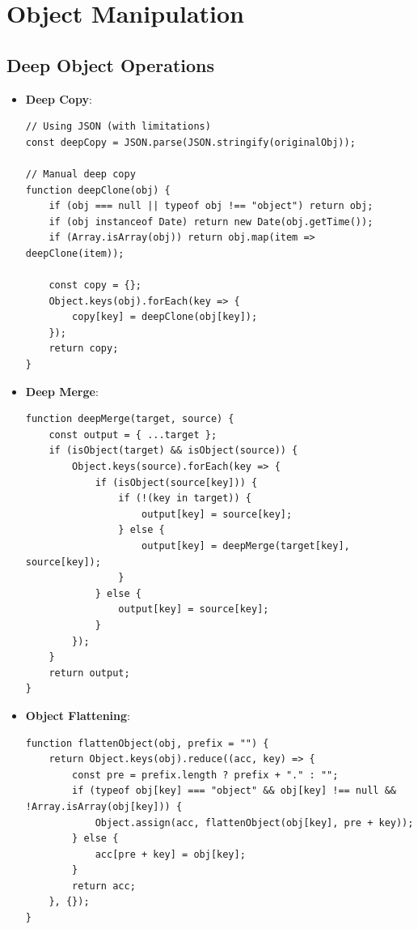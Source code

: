 \documentclass{article}
\begin{document}
\section{Object Manipulation}

\subsection{Deep Object Operations}
\begin{itemize}
    \item \textbf{Deep Copy}:
    \begin{lstlisting}
// Using JSON (with limitations)
const deepCopy = JSON.parse(JSON.stringify(originalObj));

// Manual deep copy
function deepClone(obj) {
    if (obj === null || typeof obj !== "object") return obj;
    if (obj instanceof Date) return new Date(obj.getTime());
    if (Array.isArray(obj)) return obj.map(item => deepClone(item));
    
    const copy = {};
    Object.keys(obj).forEach(key => {
        copy[key] = deepClone(obj[key]);
    });
    return copy;
}
    \end{lstlisting}
    
    \item \textbf{Deep Merge}:
    \begin{lstlisting}
function deepMerge(target, source) {
    const output = { ...target };
    if (isObject(target) && isObject(source)) {
        Object.keys(source).forEach(key => {
            if (isObject(source[key])) {
                if (!(key in target)) {
                    output[key] = source[key];
                } else {
                    output[key] = deepMerge(target[key], source[key]);
                }
            } else {
                output[key] = source[key];
            }
        });
    }
    return output;
}
    \end{lstlisting}
    
    \item \textbf{Object Flattening}:
    \begin{lstlisting}
function flattenObject(obj, prefix = "") {
    return Object.keys(obj).reduce((acc, key) => {
        const pre = prefix.length ? prefix + "." : "";
        if (typeof obj[key] === "object" && obj[key] !== null && !Array.isArray(obj[key])) {
            Object.assign(acc, flattenObject(obj[key], pre + key));
        } else {
            acc[pre + key] = obj[key];
        }
        return acc;
    }, {});
}
    \end{lstlisting}
\end{itemize}
\end{document}
